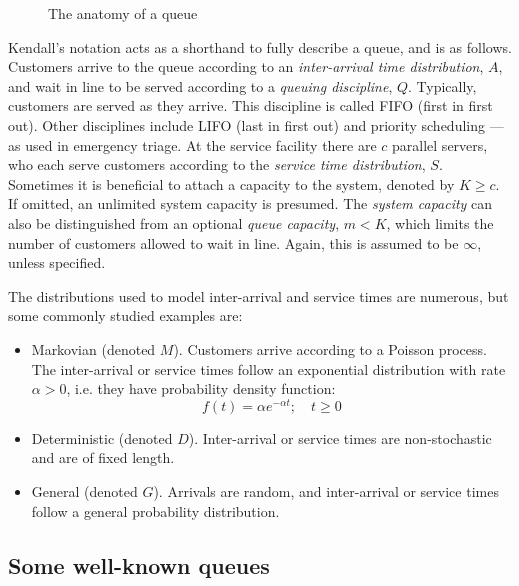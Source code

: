 \begin{figure}[htbp]
    \centering%
    \resizebox{\imgwidth}{!}{%
        
    }\caption{The anatomy of a queue}\label{fig:queue}
\end{figure}

Kendall's notation acts as a shorthand to fully describe a queue, and is as
follows. Customers arrive to the queue according to an \emph{inter-arrival time
distribution}, \(A\), and wait in line to be served according to a \emph{queuing
discipline}, \(Q\). Typically, customers are served as they arrive. This
discipline is called FIFO (first in first out). Other disciplines include LIFO
(last in first out) and priority scheduling --- as used in emergency triage. At
the service facility there are \(c\) parallel servers, who each serve customers
according to the \emph{service time distribution}, \(S\). Sometimes it is
beneficial to attach a capacity to the system, denoted by \(K \ge c\). If
omitted, an unlimited system capacity is presumed. The \emph{system capacity}
can also be distinguished from an optional \emph{queue capacity}, \(m < K\),
which limits the number of customers allowed to wait in line. Again, this is
assumed to be \(\infty\), unless specified.

The distributions used to model inter-arrival and service times are numerous,
but some commonly studied examples are:

\begin{itemize}
    \item Markovian (denoted \(M\)). Customers arrive according to a Poisson
        process. The inter-arrival or service times follow an exponential
        distribution with rate \(\alpha > 0\), i.e. they have probability
        density function:
        \begin{equation}\label{eq:exponential}
            f(t) = \alpha e^{-\alpha t}; \quad t \ge 0
        \end{equation}
    \item Deterministic (denoted \(D\)). Inter-arrival or service times are
        non-stochastic and are of fixed length.
    \item General (denoted \(G\)). Arrivals are random, and inter-arrival or
        service times follow a general probability distribution.
\end{itemize}

\subsection{Some well-known queues}\label{subsec:known}

